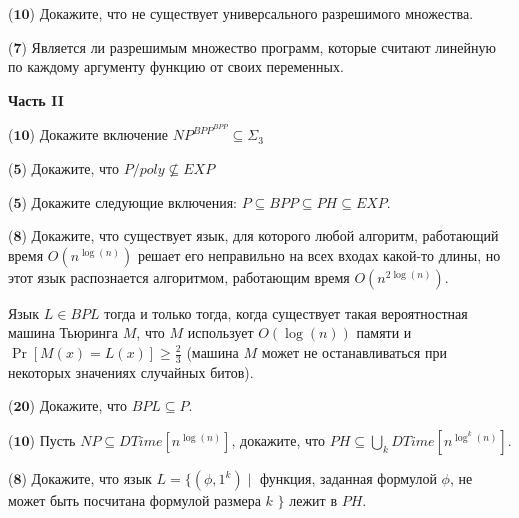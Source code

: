 \begin{task}($\mathbf{10}$)
    Докажите, что не существует универсального разрешимого множества.
\end{task}

\begin{task}($\mathbf{7}$)
    Является ли разрешимым множество программ, которые считают линейную по каждому аргументу функцию от своих переменных.
\end{task}




\begin{center}
    \textbf{Часть II}
\end{center}


\begin{task}($\mathbf{10}$)
    Докажите включение $NP^{BPP^{BPP}} \subseteq \Sigma_3$
\end{task}

\begin{task}($\mathbf{5}$)
    Докажите, что $P/poly \nsubseteq EXP$
\end{task}

\begin{task}($\mathbf{5}$)
    Докажите следующие включения: $P \subseteq BPP \subseteq PH \subseteq EXP$.
\end{task}

\begin{task}($\mathbf{8}$)
    Докажите, что существует язык, для которого любой алгоритм, работающий время
    $O(n^{\log(n)})$ решает его неправильно на всех входах какой-то длины, но
    этот язык распознается алгоритмом, работающим время $O(n^{2 \log(n)})$.
\end{task}


Язык $L \in BPL$ тогда и только тогда, когда существует такая вероятностная машина Тьюринга $M$, что $M$ использует $O(\log(n))$
памяти и $\Pr[M(x) = L(x)] \ge \frac{2}{3}$ (машина $M$ может не останавливаться при некоторых значениях случайных битов).

\begin{task}($\mathbf{20}$)
    Докажите, что $BPL \subseteq P$.
\end{task}

\begin{task}($\mathbf{10}$)
    Пусть $NP \subseteq DTime[n^{\log(n)}]$, докажите, что $PH \subseteq \bigcup\limits_{k}DTime[n^{\log^k(n)}]$.
\end{task}

\begin{task}($\mathbf{8}$)
    Докажите, что язык $L = \{(\phi, 1^k) \mid$ функция, заданная формулой $\phi$, не может быть посчитана формулой размера $k$
    $\}$ лежит в $PH$.
\end{task}